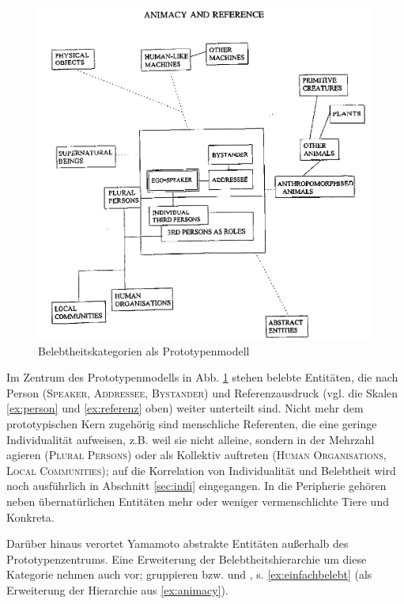 \begin{figure}[h]
\begin{center}
\includegraphics[width=12cm]{images/yamamoto2.jpg}
\caption {Belebtheitskategorien als Prototypenmodell \parencite[aus][38]{Yamamoto1999}}
\label{yamamoto}
\end{center}
\end{figure} 


Im Zentrum des Prototypenmodells in Abb. \ref{yamamoto} stehen belebte Entitäten, die nach Person (\textsc{Speaker, Addressee, Bystander}) und Referenzausdruck (vgl. die Skalen \ref{ex:person}  und \ref{ex:referenz} oben) weiter unterteilt sind. Nicht mehr dem prototypischen Kern zugehörig sind menschliche Referenten, die eine geringe Individualität aufweisen, z.B. weil sie nicht alleine, sondern in der Mehrzahl agieren (\textsc{Plural Persons}) oder als Kollektiv auftreten (\textsc{Human Organisations, Local Communities}); auf die Korrelation von Individualität und Belebtheit wird noch ausführlich in Abschnitt \ref{sec:indi} eingegangen. In die Peripherie gehören neben übernatürlichen Entitäten mehr oder weniger vermenschlichte Tiere und Konkreta.  

Darüber hinaus verortet Yamamoto abstrakte Entitäten außerhalb des Prototypenzentrums. Eine Erweiterung der Belebtheitshierarchie um diese Kategorie nehmen auch \textcite{Allan1987,Langacker1991,Croft1995} vor; \textcite[194]{Enger2011} gruppieren  bzw.  und , s. \ref{ex:einfachbelebt} (als Erweiterung der Hierarchie aus \ref{ex:animacy}).

